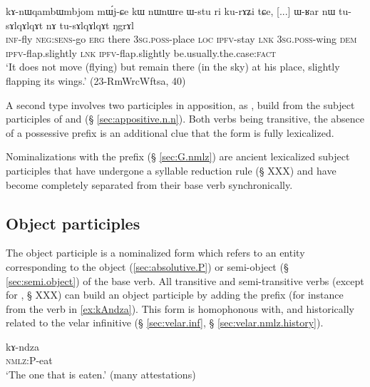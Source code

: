 \begin{exe}
\ex \label{ex:kAnWqambWmbjom.mWjCe}
 \gll  kɤ-nɯqambɯmbjom mɯ́j-ɕe kɯ nɯnɯre ɯ-stu ri ku-rɤʑi tɕe, [...] ɯ-ʁar nɯ tu-sɤlqɤlqɤt nɤ tu-sɤlqɤlqɤt ŋgrɤl  \\
 \textsc{inf}-fly \textsc{neg}:\textsc{sens}-go \textsc{erg} there \textsc{3sg}.\textsc{poss}-place \textsc{loc} \textsc{ipfv}-stay \textsc{lnk} { } \textsc{3sg}.\textsc{poss}-wing \textsc{dem} \textsc{ipfv}-flap.slightly \textsc{lnk}  \textsc{ipfv}-flap.slightly be.usually.the.case:\textsc{fact} \\
 \glt `It does not move (flying) but remain there (in the sky) at his place, slightly flapping its wings.' (23-RmWrcWftsa, 40)
\end{exe}

A second type involves two participles in apposition, as , build from the subject participles of  and   (§ \ref{sec:appositive.n.n}). Both verbs being transitive, the absence of a possessive prefix  is an additional clue that the form is fully lexicalized.

Nominalizations with the  prefix (§ \ref{sec:G.nmlz}) are ancient lexicalized subject participles that have undergone a syllable reduction rule (§ XXX) and have become completely separated from their base verb synchronically.

\subsection{Object participles} \label{sec:object.participle}
The object participle is a nominalized form which refers to an entity corresponding to the object (\ref{sec:absolutive.P}) or semi-object (§ \ref{sec:semi.object}) of the base verb. All transitive and semi-transitive verbs (except for , § XXX) can build an object participle by adding the prefix  (for instance  from the verb  in \ref{ex:kAndza}). This form is homophonous with, and historically related to the velar infinitive (§ \ref{sec:velar.inf}, § \ref{sec:velar.nmlz.history}).

 \begin{exe} 
\ex \label{ex:kAndza}
\gll kɤ-ndza \\
   \textsc{nmlz}:P-eat \\
 \glt  `The one that is eaten.' (many attestations)
 \end{exe}

